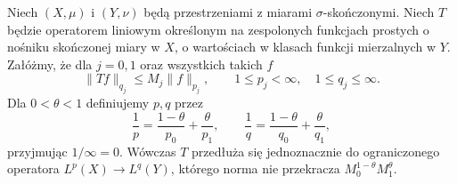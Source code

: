 \begin{twierdzenie}
\label{thm:dt-riesz-thorin}
Niech $(X,\mu)$ i $(Y,\nu)$ będą przestrzeniami
z miarami $\sigma$-skończonymi. Niech $T$ będzie
operatorem liniowym określonym na zespolonych funkcjach
prostych o nośniku skończonej miary w $X$, o wartościach
w klasach funkcji mierzalnych w $Y$.
Załóżmy, że dla $j=0,1$ oraz wszystkich takich $f$
\[
 \|Tf\|_{q_j}\le M_j\|f\|_{p_j},
 \qquad 1\le p_j<\infty,\quad 1\le q_j\le\infty.
\]
Dla $0<\theta<1$ definiujemy $p,q$ przez
\[
 \frac1p=\frac{1-\theta}{p_0}+\frac{\theta}{p_1},
 \qquad
 \frac1q=\frac{1-\theta}{q_0}+\frac{\theta}{q_1},
\]
przyjmując $1/\infty=0$. Wówczas $T$ przedłuża się
jednoznacznie do ograniczonego operatora
$L^p(X)\to L^q(Y)$, którego norma nie przekracza
$M_0^{1-\theta}M_1^\theta$.
\end{twierdzenie}
